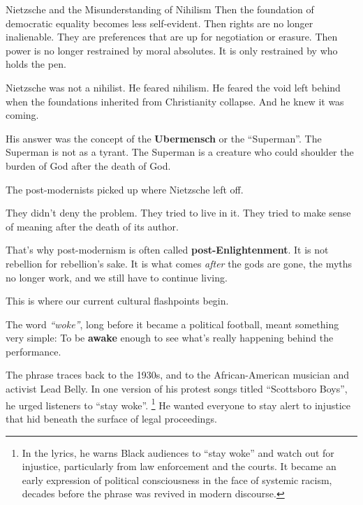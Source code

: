 \begin{HistoricalSidebar}{Nietzsche and the Misunderstanding of Nihilism}
  Then the foundation of democratic equality becomes less self-evident.  
  Then rights are no longer inalienable. They are preferences that are up for negotiation or erasure.  
  Then power is no longer restrained by moral absolutes. It is only restrained by who holds the pen.
  
  \medskip
  
  Nietzsche was not a nihilist.  
  He feared nihilism. He feared the void left behind when the foundations inherited from Christianity collapse.  
  And he knew it was coming.

  \medskip
  
  His answer was the concept of the \textbf{Ubermensch} or the ``Superman''. 
  The Superman is not as a tyrant. 
  The Superman is a creature who could shoulder the burden of God after the death of God.

  \medskip
  
  The post-modernists picked up where Nietzsche left off.

  \medskip
  
  They didn’t deny the problem.  
  They tried to live in it. 
  They tried to make sense of meaning after the death of its author.

  \medskip
  
  That’s why post-modernism is often called \textbf{post-Enlightenment}.  
  It is not rebellion for rebellion’s sake.  
  It is what comes \textit{after} the gods are gone, the myths no longer work, and we still have to 
  continue living.
  
\end{HistoricalSidebar}

\medskip

This is where our current cultural flashpoints begin.

The word \textit{``woke''}, long before it became a political football, meant something very simple:  
To be \textbf{awake} enough to see what’s really happening behind the performance.

The phrase traces back to the 1930s, and to the African-American musician and activist Lead Belly.  
In one version of his protest songs titled ``Scottsboro Boys'',
he urged listeners to ``stay woke''. \footnote{In the lyrics, he warns Black audiences to “stay woke” and 
watch out for injustice, particularly from law enforcement and the courts. It became an early expression of 
political consciousness in the face of systemic racism, 
decades before the phrase was revived in modern discourse.}
He wanted everyone to stay alert to injustice that hid beneath the 
surface of legal proceedings.

